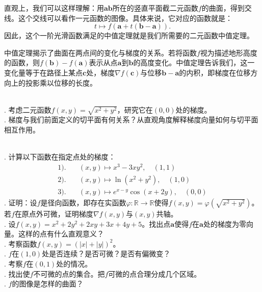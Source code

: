 \documentclass[12pt,UTF8]{ctexbook}
\begin{document}
直观上，我们可以这样理解：用$\mathbf{ab}$所在的竖直平面截二元函数$f$的曲面，得到交线。这个交线可以看作一元函数的图像。具体来说，它对应的函数就是：
$$ t\mapsto f(\mathbf{a} + t(\mathbf{b} - \mathbf{a})). $$
因此，这个一阶光滑函数满足的中值定理就是我们所需要的二元函数中值定理。

中值定理揭示了曲面在两点间的变化与梯度的关系。若将函数$f$视为描述地形高度的函数，则$f(\mathbf{b})-f(\mathbf{a})$表示从点$\mathbf{a}$到$\mathbf{b}$的高度变化。中值定理告诉我们，这一变化量等于在路径上某点$\mathbf{c}$处，梯度$\nabla f(\mathbf{c})$与位移$\mathbf{b}-\mathbf{a}$的内积，即梯度在位移方向上的投影乘以位移的长度。

\begin{sk}
\mbox{}\\
. 考虑二元函数$f(x,y) = \sqrt{x^2 + y^2}$，研究它在$(0,0)$处的梯度。\\
. 梯度与我们前面定义的切平面有何关系？从直观角度解释梯度向量如何与切平面相互作用。
\end{sk}

\begin{xt}
\mbox{}\\
. 计算以下函数在指定点处的梯度：
\begin{align*}
1).& \quad (x,y) \mapsto x^3 - 3xy^2, \quad (1,1) \\
2).& \quad (x,y) \mapsto \ln(x^2 + y^2), \quad (1,0) \\
3).& \quad (x,y) \mapsto e^{x-y}\cos(x+2y), \quad (0,0)
\end{align*}
. 证明：设$f$是径向函数，即存在实函数$\varphi:\mathbb{R}\rightarrow \mathbb{R}$使得$f(x,y) = \varphi(\sqrt{x^2 + y^2})$。若$f$在原点外可微，证明梯度$\nabla f(x,y)$与$(x,y)$共轴。\\
. 设$f(x,y) = x^2 + 2y^2 + 2xy + 3x + 4y + 5$。找出点$\mathbf{a}$使得$f$在$\mathbf{a}$处的梯度为零向量。这样的点有什么直观意义？\\
. 考察函数$f(x,y) = (|x| + |y|)^2$。\\
. $f$在$(1,0)$处是否连续？是否可微？是否有偏微变？\\
. 考察$f$在$(0,1)$处的情况。\\
. 找出使$f$不可微的点的集合。把$f$可微的点合理分成几个区域。\\
. $f$的图像是怎样的曲面？
\end{xt}
\end{document}
